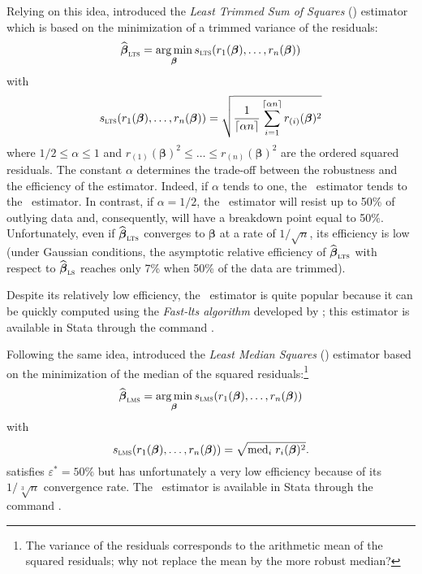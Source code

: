 Relying on this idea, \citet{Rousseeuw:1983} introduced the \emph{Least Trimmed
Sum of Squares} () estimator which is based on the minimization of a
trimmed variance of the residuals:
\[
    \sthat{\boldsymbol\beta}_{\stsc{LTS}}
     = \argmin_{\boldsymbol\beta}s_{\stsc{LTS}}(r_1(\boldsymbol\beta), \dots, r_n(\boldsymbol\beta))
\]
with
\[
    s_{\stsc{LTS}}(r_1(\boldsymbol\beta), \dots, r_n(\boldsymbol\beta))
    = \sqrt{\frac{1}{\lceil\alpha n\rceil} 
      \sum_{i=1}^{\lceil\alpha n\rceil}r_{(i)}(\boldsymbol\beta)^2}
\]
where $1/2 \leq \alpha \leq 1$ and $r_{(1)}(\boldsymbol\beta)^2 \leq \dots
\leq r_{(n)}(\boldsymbol\beta)^2$ are the ordered squared residuals. The
constant $\alpha$ determines the trade-off between the robustness and the
efficiency of the estimator. Indeed, if $\alpha$ tends to one, the 
~estimator tends to the ~estimator. In contrast, if $\alpha = 1/2$, the
~estimator will resist up to 50\% of outlying data and, consequently,
will have a breakdown point equal to 50\%. Unfortunately, even if
$\sthat{\boldsymbol\beta}_{\stsc{LTS}}$ converges to $\boldsymbol\beta$ at a
rate of $1/\sqrt{n}$, its efficiency is low (under Gaussian conditions, the
asymptotic relative efficiency of $\sthat{\boldsymbol\beta}_{\stsc{LTS}}$ with
respect to $\sthat{\boldsymbol\beta}_\stsc{LS}$ reaches only 7\% when 50\% of
the data are trimmed).

Despite its relatively low efficiency, the ~estimator is quite popular
because it can be quickly computed using the \emph{Fast-lts algorithm}
developed by \citet{rousseeuw&vdriessen99}; this estimator is available in
Stata through the command .

Following the same idea, \citet{rousseeuw:1984} introduced the \emph{Least Median
Squares} () estimator based on the minimization of the median of
the squared residuals:\footnote{The variance of the residuals corresponds to
the arithmetic mean of the squared residuals; why not replace the mean by the
more robust median?}
\[
    \sthat{\boldsymbol\beta}_{\stsc{LMS}} 
    = \argmin_{\boldsymbol\beta} s_{\stsc{LMS}}(r_1(\boldsymbol\beta), \dots, r_n(\boldsymbol\beta))
\]
with
\[
    s_{\stsc{LMS}}(r_1(\boldsymbol\beta), \dots, r_n(\boldsymbol\beta)) 
    = \sqrt{\mathrm{med}_i\;r_i(\boldsymbol\beta)^2}.
\]
 satisfies $\varepsilon^* = 50\%$ but has unfortunately a very low
efficiency because of its $1/\sqrt[3]{n}$ convergence rate. The 
~estimator is available in Stata through the command .        

